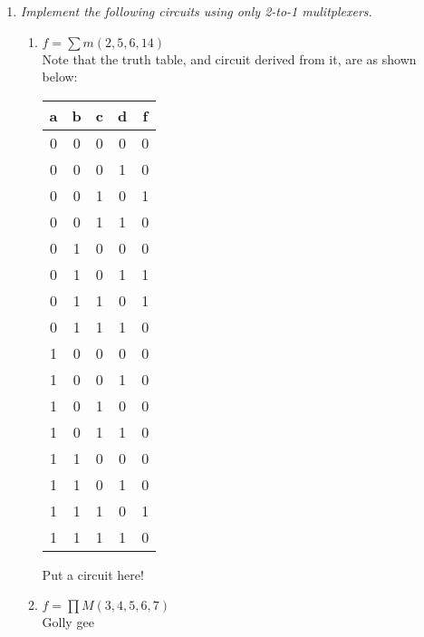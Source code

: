 \documentclass[12pt]{article}
\begin{document}
\begin{enumerate}
\newpage
\item \textit{Implement the following circuits using only 2-to-1 mulitplexers.}
  \begin{enumerate}
	   \item $f = \sum m(2,5,6,14)$ \\
	       Note that the truth table, and circuit derived from it, are as shown below:
         \begin{center}
	      	  \begin{minipage}{0.2\textwidth}
              \begin{center}
                \begin{tabular}{cccc|c}
                  a & b & c & d & f \\
                  \hline
                  0 & 0 & 0 & 0 & 0 \\
                  0 & 0 & 0 & 1 & 0 \\
                  0 & 0 & 1 & 0 & 1 \\
                  0 & 0 & 1 & 1 & 0 \\
                  0 & 1 & 0 & 0 & 0 \\
                  0 & 1 & 0 & 1 & 1 \\
                  0 & 1 & 1 & 0 & 1 \\
                  0 & 1 & 1 & 1 & 0 \\
                  1 & 0 & 0 & 0 & 0 \\
                  1 & 0 & 0 & 1 & 0 \\
                  1 & 0 & 1 & 0 & 0 \\
                  1 & 0 & 1 & 1 & 0 \\
                  1 & 1 & 0 & 0 & 0 \\
                  1 & 1 & 0 & 1 & 0 \\
                  1 & 1 & 1 & 0 & 1 \\
                  1 & 1 & 1 & 1 & 0
                \end{tabular}
              \end{center}
            \end{minipage}
            \hfill
            \begin{minipage}{0.6\textwidth}
              \begin{center}
                Put a circuit here!
              \end{center}
            \end{minipage}
          \end{center}
	   \item $f = \prod M(3,4,5,6,7)$ \\
	       Golly gee


\end{enumerate}
\end{enumerate}
\end{document}
